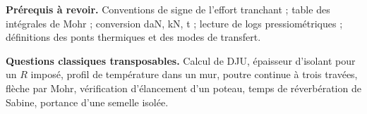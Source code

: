 \documentclass[11pt,a4paper]{article}
\begin{document}
\textbf{Prérequis à revoir.} Conventions de signe de l'effort tranchant ; table des intégrales de Mohr ; conversion daN, kN, t ; lecture de logs pressiométriques ; définitions des ponts thermiques et des modes de transfert.

\textbf{Questions classiques transposables.} Calcul de DJU, épaisseur d'isolant pour un \(R\) imposé, profil de température dans un mur, poutre continue à trois travées, flèche par Mohr, vérification d'élancement d'un poteau, temps de réverbération de Sabine, portance d'une semelle isolée.
\end{document}

